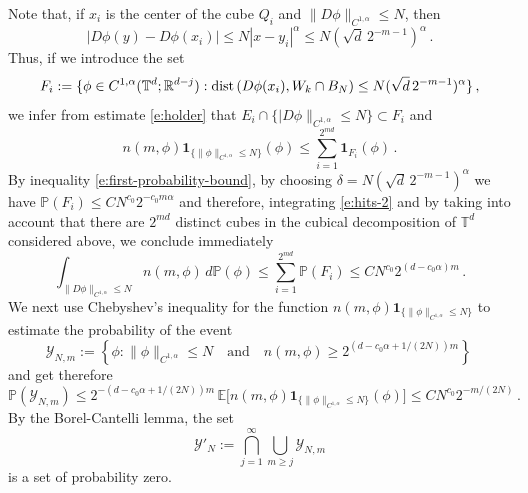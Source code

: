 \documentclass[11pt,reqno]{amsart}
\theoremstyle{definition}
\numberwithin{equation}{section}
\begin{document}
Note that, if $x_i$ is the center of the cube $Q_i$ and $\|D\phi\|_{C^{1,\alpha}}\leq N$, then 
\begin{equation} \label{e:holder}
|D\phi (y) - D\phi (x_i)|\leq N |x-y_i|^\alpha 
\leq N (\sqrt{d}\, 2^{- m-1})^\alpha\, .
\end{equation}
Thus, if we introduce the set
\[
F_i := \{\phi \in C^{1,\alpha} (\mathbb{T}^d; \mathbb{R}^{d-j}) : {\rm dist}\, (D\phi (x_i), W_k\cap B_N) \leq N (\sqrt{d}\, 2^{-m-1})^\alpha\}\, ,
\]
we infer from estimate \eqref{e:holder} that $E_i\cap \{|D\phi\|_{C^{1,\alpha}}\leq N\} \subset F_i$ and 
\begin{equation}\label{e:hits-2}
n (m, \phi) \mathbf{1}_{\{\|\phi\|_{C^{1,\alpha}}\leq N\}} (\phi) \leq \sum_{i=1}^{2^{m d}} \mathbf{1}_{F_i} (\phi)\, .
\end{equation}
By inequality \eqref{e:first-probability-bound}, by choosing $\delta = N (\sqrt{d}\, 2^{- m -1})^\alpha$ we have $\mathbb{P} (F_i) \leq C N^{c_0} 2^{-c_0 m \alpha}$ and therefore, integrating \eqref{e:hits-2} and by taking into account that there are $2^{m d}$ distinct cubes in the cubical decomposition of $\mathbb T^d$ considered above, we conclude immediately
\begin{equation}\label{e:expectation}
\int_{\|D\phi\|_{C^{1,\alpha}}\leq N} n(m, \phi)\, d\mathbb{P} (\phi) \leq \sum_{i=1}^{2^{m d}} \mathbb{P} (F_i) \leq C N^{c_0} 2^{(d-c_0 \alpha) m}\, .
\end{equation}
We next use Chebyshev's inequality for the function $n (m, \phi) \mathbf{1}_{\{\|\phi\|_{C^{1,\alpha}}\leq N\}}$ to estimate the probability of the event 
\[
\mathcal{Y}_{N, m} := \left\{\phi: \|\phi\|_{C^{1,\alpha}}\leq N \quad\mbox{and} \quad n (m, \phi) \geq  2^{(d-c_0\alpha+1/(2N)) m} \right\}\, 
\]
and get therefore
\begin{equation}\label{e:Borel-Cantelli}
\mathbb P (\mathcal{Y}_{N,m}) \leq 2^{-(d-c_0\alpha+1/(2N))m}\,  \mathbb{E} \big[ n (m, \phi) \mathbf{1}_{\{\|\phi\|_{C^{1,\alpha}}\leq N\}} (\phi) \big]\leq C N^{c_0} 2^{- m/(2N)}\, .
\end{equation}
By the Borel-Cantelli lemma, the set 
\[
\mathcal{Y}'_N := \bigcap_{j=1}^\infty \bigcup_{m \geq j} \mathcal{Y}_{N,m}
\]
is a set of probability zero. 
\end{document}
